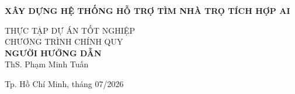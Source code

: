 \begin{titlepage}
\begin{center}

{ \normalsize \bfseries XÂY DỰNG HỆ THỐNG HỖ TRỢ TÌM NHÀ TRỌ TÍCH HỢP AI \\[2cm]}


\normalsize THỰC TẬP DỰ ÁN TỐT NGHIỆP\\
\normalsize CHƯƠNG TRÌNH CHÍNH QUY\\[1.5cm]

\textbf{NGƯỜI HƯỚNG DẪN}\\
ThS. Phạm Minh Tuấn\\



\vfill
Tp. Hồ Chí Minh, tháng 07/2026

\end{center}

\end{titlepage}
